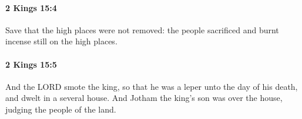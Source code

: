 		\paragraph{2 Kings 15:4} %
			\label{2KINGS-15-4}

			Save that the high places were not removed: the people sacrificed and burnt incense still on the high places.


		\paragraph{2 Kings 15:5} %
			\label{2KINGS-15-5}

			And the LORD smote the king, so that he was a leper unto the day of his death, and dwelt in a several house. And Jotham the king’s son was over the house, judging the people of the land.


